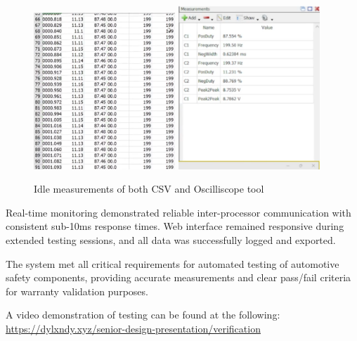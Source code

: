 \documentclass[12pt]{article}
\begin{document}
\begin{figure}[H]
  \includegraphics[width=0.475\textwidth]{../assets/csv.png}
  \includegraphics[width=0.475\textwidth]{../assets/measurements.png}
  \caption{Idle measurements of both CSV and Oscilliscope tool}
\end{figure}

Real-time monitoring demonstrated reliable inter-processor communication
with consistent sub-10ms response times. Web interface remained responsive
during extended testing sessions, and all data was successfully logged and
exported.


The system met all critical requirements for automated testing of
automotive safety components, providing accurate measurements and clear
pass/fail criteria for warranty validation purposes.

A video demonstration of testing can be found at the following:
\url{https://dylxndy.xyz/senior-design-presentation/verification}
\end{document}
